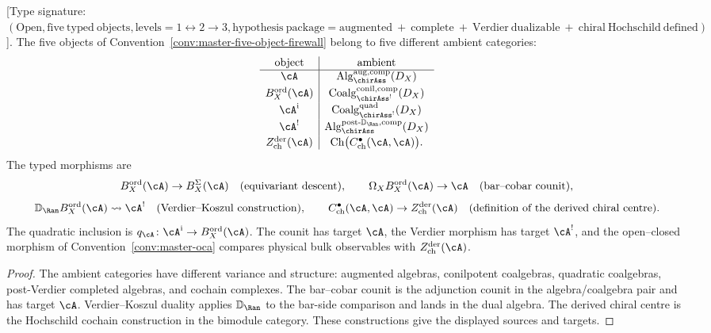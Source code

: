\begin{theorem}
\label{thm:typed-verdier-koszul-firewall}
\textup{[}Type signature:
$(\mathrm{Open},\mathrm{five\ typed\ objects},
\mathrm{levels}=1\leftrightarrow2\to3,
\mathrm{hypothesis\ package}=\mathrm{augmented}
\ +\ \mathrm{complete}
\ +\ \mathrm{Verdier\ dualizable}
\ +\ \mathrm{chiral\ Hochschild\ defined})$\textup{].}
The five objects of Convention~\ref{conv:master-five-object-firewall}
belong to five different ambient categories:
\[
\begin{array}{c|c}
\text{object} & \text{ambient}\\ \hline
\cA &
\operatorname{Alg}^{\mathrm{aug,comp}}_{\chirAss}(D_X)\\[2pt]
B_X^{\mathrm{ord}}(\cA) &
\operatorname{Coalg}^{\mathrm{conil,comp}}_{\chirAss^!}(D_X)\\[2pt]
\cA^{\mathrm i} &
\operatorname{Coalg}^{\mathrm{quad}}_{\chirAss^!}(D_X)\\[2pt]
\cA^! &
\operatorname{Alg}^{\mathrm{post}\text{-}\mathbb D_{\Ran},
\mathrm{comp}}_{\chirAss}(D_X)\\[2pt]
Z^{\mathrm{der}}_{\mathrm{ch}}(\cA) &
\operatorname{Ch}\bigl(C^\bullet_{\mathrm{ch}}(\cA,\cA)\bigr).
\end{array}
\]
The typed morphisms are
\[
B_X^{\mathrm{ord}}(\cA)\to B_X^\Sigma(\cA)
\quad(\text{equivariant descent}),\qquad
\Omega_XB_X^{\mathrm{ord}}(\cA)\to\cA
\quad(\text{bar--cobar counit}),
\]
\[
\mathbb D_{\Ran}B_X^{\mathrm{ord}}(\cA)\rightsquigarrow\cA^!
\quad(\text{Verdier--Koszul construction}),\qquad
C^\bullet_{\mathrm{ch}}(\cA,\cA)\to
Z^{\mathrm{der}}_{\mathrm{ch}}(\cA)
\quad(\text{definition of the derived chiral centre}).
\]
The quadratic inclusion is
\(q_\cA\colon\cA^{\mathrm i}\to B_X^{\mathrm{ord}}(\cA)\).
The counit has target \(\cA\), the Verdier morphism has target
\(\cA^!\), and the open--closed morphism of
Convention~\ref{conv:master-oca} compares physical bulk observables
with \(Z^{\mathrm{der}}_{\mathrm{ch}}(\cA)\).
\end{theorem}

\begin{proof}
The ambient categories have different variance and structure:
augmented algebras, conilpotent coalgebras, quadratic coalgebras,
post-Verdier completed algebras, and cochain complexes.  The bar--cobar
counit is the adjunction counit in the algebra/coalgebra pair and has
target \(\cA\).  Verdier--Koszul duality applies
\(\mathbb D_{\Ran}\) to the bar-side comparison and lands in the dual
algebra.  The derived chiral centre is the Hochschild cochain
construction in the bimodule category.  These constructions give the
displayed sources and targets.
\end{proof}

